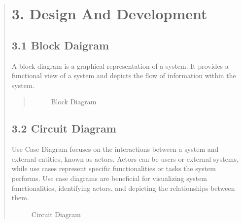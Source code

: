 \documentclass[12pt]{report}
\begin{document}
\begin{quote}
\begin{quote}
\begin{quote}
			\end{quote}
			
		\end{quote}
	\end{quote}
	\clearpage
	
	
	\begin{quote}
		\section{3. Design And Development}
		
		\subsection{3.1 Block Daigram}
		A block diagram is a graphical representation of a system. It provides a functional view of a system and depicts the flow of information within the system.\\
		
		\begin{quote}
			
			
			\begin{figure}
				\centering
				\caption{Block Diagram}
			\end{figure}
			
		\end{quote}
		\clearpage
		\subsection{3.2 Circuit Diagram}
		Use Case Diagram focuses on the interactions between a system and external entities, known as actors. Actors can be users or external systems, while use cases represent specific functionalities or tasks the system performs. Use case diagrams are beneficial for visualizing system functionalities, identifying actors, and depicting the relationships between them.
		\begin{figure}
			\centering
			\caption{Circuit Diagram}
		\end{figure}
		\clearpage
		
	\end{quote}
	\clearpage
	
\end{document}
